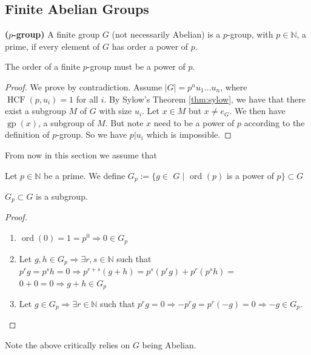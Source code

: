 \documentclass{article}
\newcommand{\bfs}[1]{\textbf{({#1}) }}
\newcommand{\gp}{\operatorname{gp}}
\newcommand{\HCF}{\operatorname{HCF}}
\begin{document}
\subsection{Finite Abelian Groups}
\begin{defa}{\bfs{$p$-group}}
 A finite group $G$ (not necessarily Abelian) is a $p$-group, with $p \in \mathbb{N}$, a prime, if every element of $G$ has order a power of $p$.
\end{defa} 
\begin{lema}\label{lem:djfdacf}
 The order of a finite $p$-group must be a power of $p$.
\end{lema}
\begin{proof}
We prove by contradiction. Assume $|G|=p^nu_1\ldots u_n$, where $\HCF(p,u_i)=1$ for all $i$.  By Sylow's Theorem \cref{thm:sylow}, we have that there exist a subgroup $M$ of $G$ with size $u_i$. Let $x\in M$ but $x\ne e_G$. We then have $\gp(x)$, a subgroup of $M$. But note $x$ need to be a power of $p$ according to the definition of  $p$-group. So we have $p|u_i$ which is impossible.
\end{proof}
From now in this section we assume that

\centerline{}

Let $p \in \mathbb{N}$ be a prime. We define $G_{p}:=\{g \in$ $G \mid$ ord $(p)$ is a power of $p\} \subset G$
\begin{thma}
$G_{p} \subset G$ is a subgroup.
\end{thma}
\begin{proof}
\begin{enumerate}
    \item  $\operatorname{ord}(0)=1=p^{0} \Rightarrow 0 \in G_{p}$
    \item Let $g, h \in G_{p} \Rightarrow \exists r, s \in \mathbb{N}$ such that $p^{r} g=p^{s} h=0 \Rightarrow p^{r+s}(g+h)=p^{s}\left(p^{r} g\right)+p^{r}\left(p^{s} h\right)=$
$0+0=0 \Rightarrow g+h \in G_{p}$
\item Let $g \in G_{p} \Rightarrow \exists r \in \mathbb{N}$ such that $p^{r} g=0 \Rightarrow-p^{r} g=p^{r}(-g)=0 \Rightarrow-g \in G_{p}$.
\end{enumerate}
\end{proof}
\begin{rema}
Note the above critically relies on $G$ being Abelian. 
\end{rema}
\end{document}
